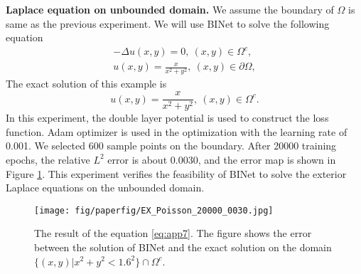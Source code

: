 \documentclass[hyperref]{article}
\numberwithin{equation}{section}
\theoremstyle{nonumberplain}
\begin{document}
	
	
	
	
	
	\noindent \textbf{Laplace equation on unbounded domain.} We assume the boundary of $\Omega$ is same as the previous experiment. We will use BINet to solve the following equation
	\begin{equation}
		\begin{aligned}
			-\Delta u(x,y) = 0,\ (x,y)\in\Omega^c,\\
			u(x,y) = \frac{x}{x^2+y^2}, \ (x,y)\in\partial\Omega,
		\end{aligned}
		\label{eq:app7}
	\end{equation}
	The exact solution of this example is 
	$$
	u(x,y) = \frac{x}{x^2+y^2},\ (x,y)\in\Omega^c.
	$$
	In this experiment, the double layer potential is used to construct the loss function. Adam optimizer is used in the optimization with the learning rate of 0.001. We selected 600 sample points on the boundary. After 20000 training epochs, the relative $L^2$ error is about 0.0030, and the error map is shown in Figure \ref{fig:eq7}. This experiment verifies the feasibility of BINet to solve the exterior Laplace equations on the unbounded domain.  
	
	\noindent
	\begin{figure}[t]
		\centering
		\texttt{[image: fig/paperfig/EX\_Poisson\_20000\_0030.jpg]}
		\caption{The result of the equation \eqref{eq:app7}. The figure shows the error between the solution of BINet and the exact solution on the domain $\{(x,y)|x^2+y^2<1.6^2\}\cap\Omega^c$.}
		\label{fig:eq7}
	\end{figure}
	
\end{document}
